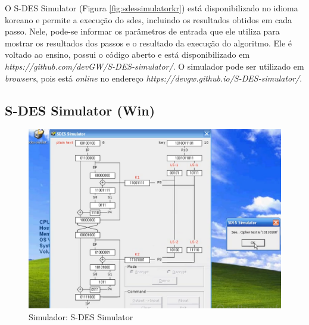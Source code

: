 O S-DES Simulator (Figura \ref{fig:sdessimulatorkr}) está disponibilizado no idioma koreano e permite a execução do \acrshort{sdes}, incluindo os resultados obtidos em cada passo. Nele, pode-se informar os parâmetros de entrada que ele utiliza para mostrar os resultados dos passos e o resultado da execução do algoritmo. Ele é voltado ao ensino, possui o código aberto e está disponibilizado em \textit{https://github.com/devGW/S-DES-simulator/}. O simulador pode ser utilizado em \textit{browsers}, pois está \textit{online} no endereço \textit{https://devgw.github.io/S-DES-simulator/}. \cite{woo18}


\subsection{S-DES Simulator (Win)}

\begin{figure}[H]
    \centering
    \caption{Simulador: S-DES Simulator}
    \label{fig:sdessimulatoren}
    \includegraphics[width=1.2\linewidth,center]{Simuladores/SDESSimulatorXp.png}
\end{figure}

